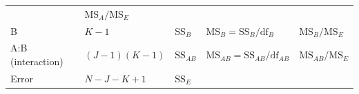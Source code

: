 \documentclass[]{book}
\theoremstyle{definition}
\theoremstyle{definition}
\theoremstyle{remark}
\begin{document}
\begin{longtable}[]{@{}lllll@{}}
\begin{minipage}[t]{0.21\columnwidth}
\end{minipage} & \begin{minipage}[t]{0.12\columnwidth}\raggedright\strut
\(\text{MS}_A/\text{MS}_E\)\strut
\end{minipage}\tabularnewline
\begin{minipage}[t]{0.16\columnwidth}\raggedright\strut
B\strut
\end{minipage} & \begin{minipage}[t]{0.17\columnwidth}\raggedright\strut
\(K-1\)\strut
\end{minipage} & \begin{minipage}[t]{0.19\columnwidth}\raggedright\strut
\(\text{SS}_B\)\strut
\end{minipage} & \begin{minipage}[t]{0.21\columnwidth}\raggedright\strut
\(\text{MS}_B=\text{SS}_B/\text{df}_B\)\strut
\end{minipage} & \begin{minipage}[t]{0.12\columnwidth}\raggedright\strut
\(\text{MS}_B/\text{MS}_E\)\strut
\end{minipage}\tabularnewline
\begin{minipage}[t]{0.16\columnwidth}\raggedright\strut
A:B (interaction)\strut
\end{minipage} & \begin{minipage}[t]{0.17\columnwidth}\raggedright\strut
\((J-1)(K-1)\)\strut
\end{minipage} & \begin{minipage}[t]{0.19\columnwidth}\raggedright\strut
\(\text{SS}_{AB}\)\strut
\end{minipage} & \begin{minipage}[t]{0.21\columnwidth}\raggedright\strut
\(\text{MS}_{AB}=\text{SS}_{AB}/\text{df}_{AB}\)\strut
\end{minipage} & \begin{minipage}[t]{0.12\columnwidth}\raggedright\strut
\(\text{MS}_{AB}/\text{MS}_E\)\strut
\end{minipage}\tabularnewline
\begin{minipage}[t]{0.16\columnwidth}\raggedright\strut
Error\strut
\end{minipage} & \begin{minipage}[t]{0.17\columnwidth}\raggedright\strut
\(N-J-K+1\)\strut
\end{minipage} & \begin{minipage}[t]{0.19\columnwidth}\raggedright\strut
\(\text{SS}_E\)\strut
\end{minipage} & \begin{minipage}[t]{0.21\columnwidth}\raggedright\strut

\end{minipage}
\end{longtable}
\end{document}
